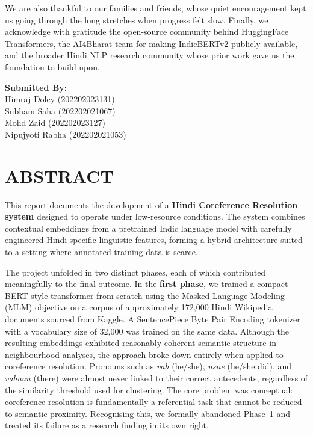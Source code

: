 \documentclass[12pt,a4paper]{report}
\begin{document}
\noindent We are also thankful to our families and friends, whose quiet encouragement kept us going through the long stretches when progress felt slow. Finally, we acknowledge with gratitude the open-source community behind HuggingFace Transformers, the AI4Bharat team for making IndicBERTv2 publicly available, and the broader Hindi NLP research community whose prior work gave us the foundation to build upon.

\vspace{1cm}
\begin{flushright}
\textbf{Submitted By:}\\
Himraj Doley    (202202023131)\\
Subham Saha     (202202021067)\\
Mohd Zaid       (202202023127)\\
Nipujyoti Rabha (202202021053)
\end{flushright}


\newpage
\chapter*{\fontsize{16}{19}\selectfont ABSTRACT}

\noindent This report documents the development of a \textbf{Hindi Coreference Resolution system} designed to operate under low-resource conditions. The system combines contextual embeddings from a pretrained Indic language model with carefully engineered Hindi-specific linguistic features, forming a hybrid architecture suited to a setting where annotated training data is scarce.

\noindent The project unfolded in two distinct phases, each of which contributed meaningfully to the final outcome. In the \textbf{first phase}, we trained a compact BERT-style transformer from scratch using the Masked Language Modeling (MLM) objective on a corpus of approximately 172,000 Hindi Wikipedia documents sourced from Kaggle. A SentencePiece Byte Pair Encoding tokenizer with a vocabulary size of 32,000 was trained on the same data. Although the resulting embeddings exhibited reasonably coherent semantic structure in neighbourhood analyses, the approach broke down entirely when applied to coreference resolution. Pronouns such as \textit{vah} (he/she), \textit{usne} (he/she did), and \textit{vahaan} (there) were almost never linked to their correct antecedents, regardless of the similarity threshold used for clustering. The core problem was conceptual: coreference resolution is fundamentally a referential task that cannot be reduced to semantic proximity. Recognising this, we formally abandoned Phase~1 and treated its failure as a research finding in its own right.
\end{document}
